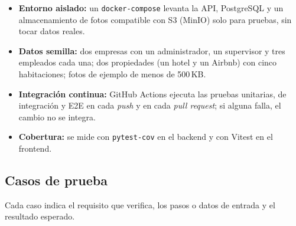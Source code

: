 \documentclass[11pt,a4paper]{article}
\begin{document}
\begin{itemize}[leftmargin=1.2em]
  \item \textbf{Entorno aislado:} un \texttt{docker-compose} levanta la API, PostgreSQL y un almacenamiento de fotos compatible con S3 (MinIO) solo para pruebas, sin tocar datos reales.
  \item \textbf{Datos semilla:} dos empresas con un administrador, un supervisor y tres empleados cada una; dos propiedades (un hotel y un Airbnb) con cinco habitaciones; fotos de ejemplo de menos de 500\,KB.
  \item \textbf{Integración continua:} GitHub Actions ejecuta las pruebas unitarias, de integración y E2E en cada \emph{push} y en cada \emph{pull request}; si alguna falla, el cambio no se integra.
  \item \textbf{Cobertura:} se mide con \texttt{pytest-cov} en el backend y con Vitest en el frontend.
\end{itemize}

\subsection{Casos de prueba}

Cada caso indica el requisito que verifica, los pasos o datos de entrada y el resultado esperado.
\end{document}

